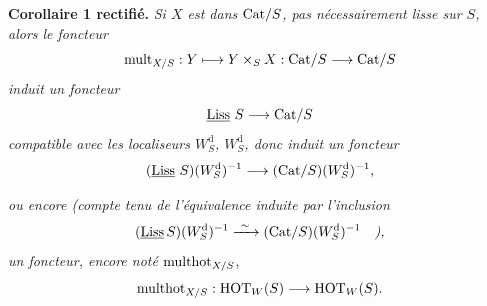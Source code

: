 \textbf{Corollaire 1 rectifié.} \textit{Si $X$ est dans} $\mathrm{Cat}/S$\textit{, pas nécessairement lisse sur $S$, alors le foncteur}
\[\mathrm{mult}_{X/S} : Y\longmapsto Y\times_S X : \mathrm{Cat}/S\longrightarrow \mathrm{Cat}/S\]
\textit{induit un foncteur}
\[\underline{\mathrm{Liss}}\,\,S\longrightarrow \mathrm{Cat}/S\]
\textit{compatible avec les localiseurs $W_S^{\mathrm{d}}$, $W_S^{\mathrm{d}}$, donc induit un foncteur}
\[(\underline{\mathrm{Liss}}\,\,S)(W_S^{\mathrm{d}})^{-1}\longrightarrow(\mathrm{Cat}/S)(W_S^{\mathrm{d}})^{-1},\]

\textit{ou encore (compte tenu de l'équivalence induite par l'inclusion}
\[(\underline{\mathrm{Liss}}\,S)(W_S^{\mathrm{d}})^{-1}\xrightarrow{\ \sim\ }(\Cat/S)(W_S^{\mathrm{d}})^{-1}\quad\textit{),}\] %
\textit{un foncteur, encore noté} $\mathrm{multhot}_{X/S}$,
\[\mathrm{multhot}_{X/S} : \mathrm{HOT}_W(S)\longrightarrow\mathrm{HOT}_W(S).\]

